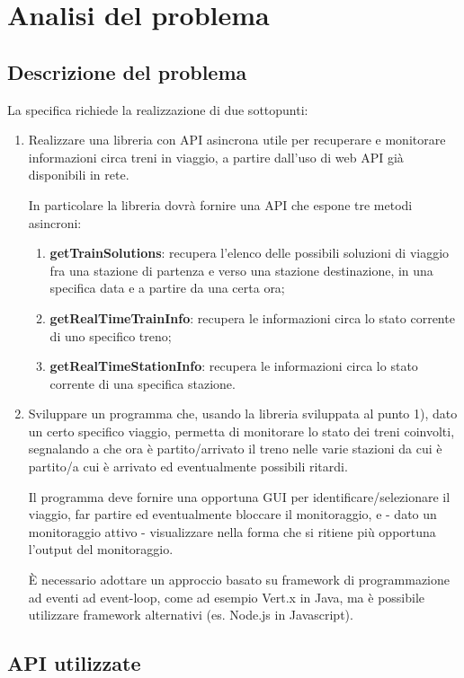 \section{Analisi del problema}

\subsection{Descrizione del problema}
La specifica richiede la realizzazione di due sottopunti:
\begin{enumerate}
    \item Realizzare una libreria con API asincrona utile per recuperare e monitorare informazioni circa treni in viaggio, a partire dall'uso di web API già disponibili in rete.

In particolare la libreria dovrà fornire una API che espone tre metodi asincroni:
\begin{enumerate}
    \item \textbf{getTrainSolutions}: recupera l'elenco delle possibili soluzioni di viaggio fra una stazione di partenza e verso una stazione destinazione, in una specifica data e a partire da una certa ora;
    \item \textbf{getRealTimeTrainInfo}: recupera le informazioni circa lo stato corrente di uno specifico treno;
    \item \textbf{getRealTimeStationInfo}: recupera le informazioni circa lo stato corrente di una specifica stazione.
\end{enumerate}
\item Sviluppare un programma che, usando la libreria sviluppata al punto 1), dato un certo specifico viaggio, permetta di monitorare lo stato dei treni coinvolti, segnalando a che ora è partito/arrivato il treno nelle varie stazioni da cui è partito/a cui è arrivato ed eventualmente possibili ritardi.

Il programma deve fornire una opportuna GUI per identificare/selezionare il viaggio, far partire ed eventualmente bloccare il monitoraggio, e - dato un monitoraggio attivo -  visualizzare nella forma che si ritiene più opportuna l'output del monitoraggio.

È necessario adottare un approccio basato su framework di programmazione ad eventi ad event-loop, come ad esempio Vert.x in Java, ma è possibile utilizzare framework alternativi (es. Node.js in Javascript).

\end{enumerate}

\subsection{API utilizzate}

